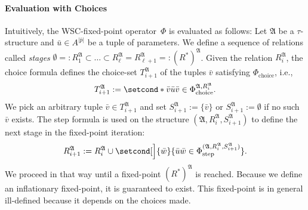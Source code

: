 \documentclass[]{lmcs}
\newcommand{\defining}[1]{\emph{#1}}
\newcommand{\set}[1]{\lbrace #1 \rbrace}
\newcommand{\formA}{\Phi}
\newcommand{\tup}[1]{\bar{#1}}
\newcommand{\Struct}{\mathfrak{A}}
\newcommand{\vertA}{u}
\newcommand{\vertB}{v}
\newcommand{\vertC}{w}
\newcommand{\StructA}{\mathfrak{A}}
\newcommand{\StructVA}{A}
\newcommand{\sig}{\tau}
\newcommand{\formStep}{\formA_{\text{step}}}
\newcommand{\formChoice}{\formA_{\text{choice}}}
\begin{document}
\paragraph{Evaluation with Choices }
Intuitively, the WSC-fixed-point operator~$\formA$ is evaluated as follows:
Let $\StructA$ be a $\sig$\nobreakdash-structure
and $\tup{\vertA} \in \StructVA^{|\tup{p}|}$ be a tuple of parameters.
We define a sequence of relations called \defining{stages} $\emptyset =: R_1^\Struct \subset \dots \subset  R_\ell^\Struct = R_{\ell+1}^\Struct =: (R^*)^\Struct$.
Given the relation $R_i^\Struct$,
the choice formula defines the choice-set $T_{i+1}^\Struct$
of the tuples $\tup{\vertB}$ satisfying $\formChoice$, i.e.,
\[T_{i+1}^\Struct := \setcond*{\tup{\vertB}}{\tup{\vertA}\tup{\vertB} \in \formChoice^{\Struct, \smash{R_i^\StructA}}}.\]
We pick an arbitrary tuple $\tup{\vertB} \in T_{i+1}^\Struct$
and set $S_{i+1}^\Struct := \set{\tup{\vertB}}$
or $S_{i+1}^\Struct := \emptyset$ if no such $\tup{\vertB}$ exists.
The step formula
is used on the structure $(\StructA, R_i^\Struct, S_{i+1}^\Struct)$ to define the next stage in the fixed-point iteration:
\[R_{i+1}^\Struct :=  R_{i}^\Struct \cup \setcond[\Big]{\tup{\vertC}}{\tup{\vertA}\tup{\vertC} \in \formStep^{(\StructA, R_i^\Struct, S_{i+1}^\Struct)}}.\]
We proceed in that way until a fixed-point $(R^*)^\Struct$ is reached.
Because we define an inflationary fixed-point, it is guaranteed to exist.
This fixed-point is in general ill-defined
because it depends on the choices made.
\end{document}
